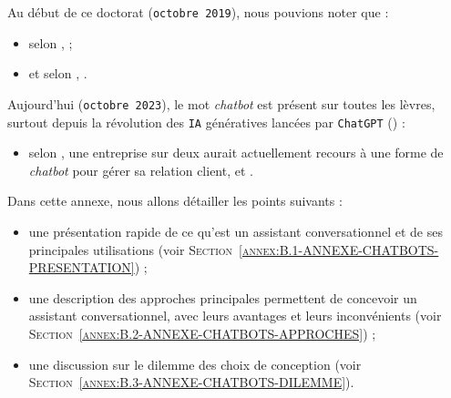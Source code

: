 \DontFrameThisInToc
{}
\label{annex:B-ANNEXE-CHATBOTS}
	
	
	Au début de ce doctorat (\texttt{octobre 2019}), nous pouvions noter que :
	\begin{itemize}
		\item selon \cite{costello-lodolce:2019:gartner-top-technologies},  ;
		\item et selon \cite{goasduff:2019:chatbots-will-appeal}, .
	\end{itemize}
	
	Aujourd'hui (\texttt{octobre 2023}), le mot \textit{chatbot} est présent sur toutes les lèvres, surtout depuis la révolution des \texttt{IA} génératives lancées par \texttt{ChatGPT} (\cite{openai:2023:chatgpt}) :
	\begin{itemize}
		\item selon \cite{costello-lodolce:2022:gartner-predicts-chatbots}, une entreprise sur deux aurait actuellement recours à une forme de \textit{chatbot} pour gérer sa relation client, et .
	\end{itemize}

	Dans cette annexe, nous allons détailler les points suivants :
	\begin{itemize}
		\item une présentation rapide de ce qu'est un assistant conversationnel et de ses principales utilisations (voir \textsc{Section~\ref{annex:B.1-ANNEXE-CHATBOTS-PRESENTATION}}) ;
		\item une description des approches principales permettent de concevoir un assistant conversationnel, avec leurs avantages et leurs inconvénients (voir \textsc{Section~\ref{annex:B.2-ANNEXE-CHATBOTS-APPROCHES}}) ;
		\item une discussion sur le dilemme des choix de conception (voir \textsc{Section~\ref{annex:B.3-ANNEXE-CHATBOTS-DILEMME}}).
	\end{itemize}
	
